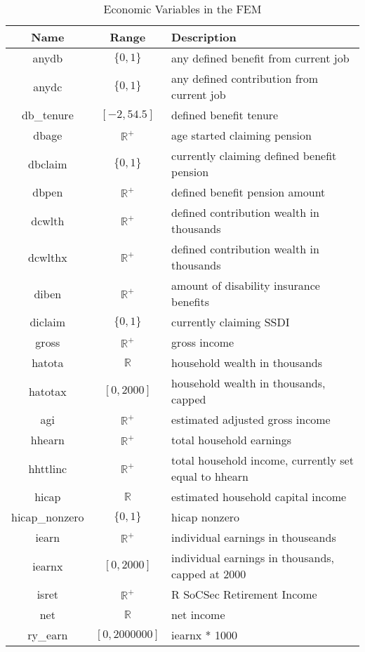 \documentclass{article}
\begin{document}
\begin{table}[ht]
\centering
\caption{Economic Variables in the FEM}
\begin{tabular}{|c|c|l|}\hline
\textbf{Name} & \textbf{Range} & \textbf{Description} \\\hline
anydb & $\{0, 1\}$ & any defined benefit from current job\\\hline
anydc & $\{0,1\}$ & any defined contribution from current job\\\hline
db\_tenure & $[-2, 54.5]$ & defined benefit tenure\\\hline
dbage & $\mathbb{R}^+$ & age started claiming pension\\\hline
dbclaim & $\{0,1\}$ & currently claiming defined benefit pension\\\hline
dbpen & $\mathbb{R}^+$ & defined benefit pension amount\\\hline
dcwlth & $\mathbb{R}^+$ & defined contribution wealth in thousands\\\hline
dcwlthx & $\mathbb{R}^+$ & defined contribution wealth in thousands\\\hline
diben & $\mathbb{R}^+$ & amount of disability insurance benefits\\\hline
diclaim & $\{0, 1\}$& currently claiming SSDI\\\hline
gross & $\mathbb{R}^+$ & gross income\\\hline
hatota & $\mathbb{R}$ & household wealth in thousands\\\hline
hatotax & $[0, 2000]$ & household wealth in thousands, capped\\\hline
agi & $\mathbb{R}^+$ & estimated adjusted gross income\\\hline
hhearn & $\mathbb{R}^+$ & total household earnings\\\hline
hhttlinc & $\mathbb{R}^+$ & total household income, currently set equal to hhearn\\\hline
hicap & $\mathbb{R}$ & estimated household capital income\\\hline
hicap\_nonzero & $\{0, 1\}$ & hicap nonzero\\\hline
iearn & $\mathbb{R}^+$ & individual earnings in thouseands\\\hline
iearnx & $[0, 2000]$ & individual earnings in thousands, capped at 2000\\\hline
isret & $\mathbb{R}^+$ & R SoCSec Retirement Income\\\hline
net & $\mathbb{R}$ & net income\\\hline
ry\_earn & $[0, 2000000]$ & iearnx * 1000\\\hline

\end{tabular}
\end{table}
\end{document}
